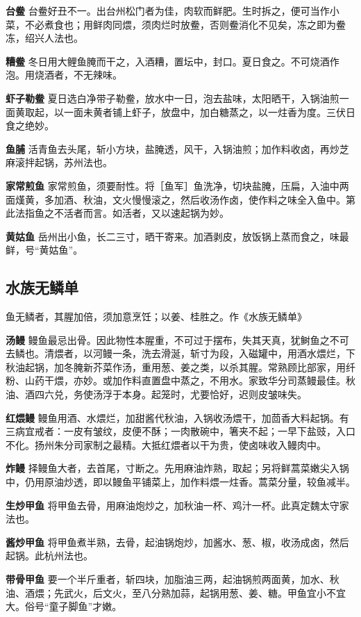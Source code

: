 \documentclass[]{article}
\begin{document}
\textbf{台鲞}
台鲞好丑不一。出台州松门者为佳，肉软而鲜肥。生时拆之，便可当作小菜，不必煮食也；用鲜肉同煨，须肉烂时放鲞，否则鲞消化不见矣，冻之即为鲞冻，绍兴人法也。

\textbf{糟鲞}
冬日用大鲤鱼腌而干之，入酒糟，置坛中，封口。夏日食之。不可烧酒作泡。用烧酒者，不无辣味。

\textbf{虾子勒鲞}
夏日选白净带子勒鲞，放水中一日，泡去盐味，太阳晒干，入锅油煎一面黄取起，以一面未黄者铺上虾子，放盘中，加白糖蒸之，以一炷香为度。三伏日食之绝妙。

\textbf{鱼脯}
活青鱼去头尾，斩小方块，盐腌透，风干，入锅油煎；加作料收卤，再炒芝麻滚拌起锅，苏州法也。

\textbf{家常煎鱼}
家常煎鱼，须要耐性。将［鱼军］鱼洗净，切块盐腌，压扁，入油中两面熯黄，多加酒、秋油，文火慢慢滚之，然后收汤作卤，使作料之味全入鱼中。第此法指鱼之不活者而言。如活者，又以速起锅为妙。

\textbf{黄姑鱼}
岳州出小鱼，长二三寸，晒干寄来。加酒剥皮，放饭锅上蒸而食之，味最鲜，号``黄姑鱼''。

\hypertarget{header-n25}{%
\subsection{水族无鳞单}\label{header-n25}}

鱼无鳞者，其腥加倍，须加意烹饪；以姜、桂胜之。作《水族无鳞单》

\textbf{汤鳗}
鳗鱼最忌出骨。因此物性本腥重，不可过于摆布，失其天真，犹鲥鱼之不可去鳞也。清煨者，以河鳗一条，洗去滑涎，斩寸为段，入磁罐中，用酒水煨烂，下秋油起锅，加冬腌新芥菜作汤，重用葱、姜之类，以杀其腥。常熟顾比部家，用纤粉、山药干煨，亦妙。或加作料直置盘中蒸之，不用水。家致华分司蒸鳗最佳。秋油、酒四六兑，务使汤浮于本身。起笼时，尤要恰好，迟则皮皱味失。

\textbf{红煨鳗}
鳗鱼用酒、水煨烂，加甜酱代秋油，入锅收汤煨干，加茴香大料起锅。有三病宜戒者：一皮有皱纹，皮便不酥；一肉散碗中，箸夹不起；一早下盐豉，入口不化。扬州朱分司家制之最精。大抵红煨者以干为贵，使卤味收入鳗肉中。

\textbf{炸鳗}
择鳗鱼大者，去首尾，寸断之。先用麻油炸熟，取起；另将鲜蒿菜嫩尖入锅中，仍用原油炒透，即以鳗鱼平铺菜上，加作料煨一炷香。蒿菜分量，较鱼减半。

\textbf{生炒甲鱼}
将甲鱼去骨，用麻油炮炒之，加秋油一杯、鸡汁一杯。此真定魏太守家法也。

\textbf{酱炒甲鱼}
将甲鱼煮半熟，去骨，起油锅炮炒，加酱水、葱、椒，收汤成卤，然后起锅。此杭州法也。

\textbf{带骨甲鱼}
要一个半斤重者，斩四块，加脂油三两，起油锅煎两面黄，加水、秋油、酒煨；先武火，后文火，至八分熟加蒜，起锅用葱、姜、糖。甲鱼宜小不宜大。俗号``童子脚鱼''才嫩。
\end{document}
